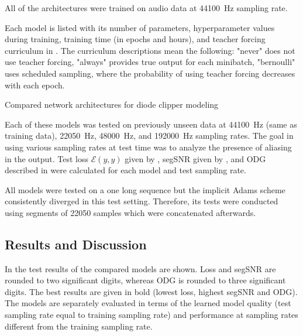 All of the architectures were trained on audio data at \SI{44100}{Hz} sampling rate.

Each model is listed with its number of parameters,
hyperparameter values during training, training time (in epochs and hours), and teacher forcing curriculum in . The curriculum descriptions mean the following: "never" does not use teacher forcing, "always" provides true output for each minibatch, "bernoulli" uses scheduled sampling, where the probability of using teacher forcing decreases with each epoch. 
\begin{table}[]
    \caption{Compared network architectures for diode clipper modeling}
    
    \label{tab:diode_clipper_models_data}
\end{table}

Each of these models was tested on previously unseen data at \SI{44100}{Hz} (same as training data), \SI{22050}{Hz}, \SI{48000}{Hz}, and \SI{192000}{Hz} sampling rates. The goal in using various sampling rates at test time was to analyze the presence of aliasing in the output. Test loss $\mathcal{E}(y, \hat{y})$ given by , \ac{segSNR} given by , and \ac{ODG} described in 
were calculated for each model and test sampling rate.

All models were tested on a one long sequence but the implicit Adams scheme consistently diverged in this test setting. Therefore, its tests were conducted using segments of 22050 samples which were concatenated afterwards.

\subsection{Results and Discussion}
\label{sec:diode_clipper_results}

In  the test results of the compared models are shown. Loss and \ac{segSNR} are rounded to two significant digits, whereas \ac{ODG} is rounded to three significant digits. The best results are given in bold (lowest loss, highest \ac{segSNR} and \ac{ODG}). The models are separately evaluated in terms of the learned model quality (test sampling rate equal to training sampling rate) and performance at sampling rates different from the training sampling rate. 

